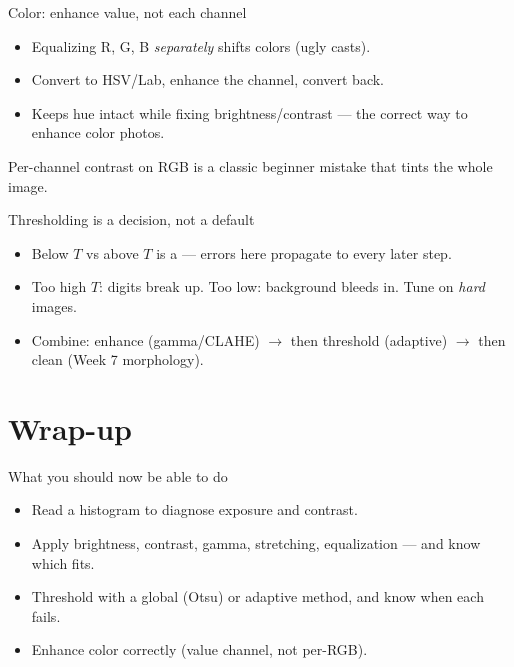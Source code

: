 \documentclass[10pt,aspectratio=169]{beamer}
\begin{document}
\begin{frame}{Color: enhance value, not each channel}
  \begin{itemize}
    \item Equalizing R, G, B \emph{separately} shifts colors (ugly casts).
    \item Convert to HSV/Lab, enhance the  channel, convert back.
    \item Keeps hue intact while fixing brightness/contrast — the correct way to enhance color photos.
  \end{itemize}
  \begin{badbox}
    Per-channel contrast on RGB is a classic beginner mistake that tints the whole image.
  \end{badbox}
\end{frame}

\begin{frame}{Thresholding is a decision, not a default}
  \begin{itemize}
    \item Below $T$ vs above $T$ is a  — errors here propagate to every later step.
    \item Too high $T$: digits break up. Too low: background bleeds in. Tune on \emph{hard} images.
    \item Combine: enhance (gamma/CLAHE) $\rightarrow$ then threshold (adaptive) $\rightarrow$ then clean (Week 7 morphology).
  \end{itemize}
\end{frame}

\section{Wrap-up}

\begin{frame}{What you should now be able to do}
  \begin{itemize}
    \item Read a histogram to diagnose exposure and contrast.
    \item Apply brightness, contrast, gamma, stretching, equalization — and know which fits.
    \item Threshold with a global (Otsu) or adaptive method, and know when each fails.
    \item Enhance color correctly (value channel, not per-RGB).
  \end{itemize}
\end{frame}
\end{document}
